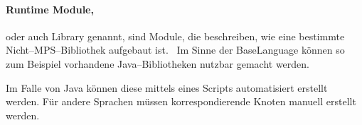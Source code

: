 \paragraph{Runtime Module,} oder auch Library genannt, sind Module, die beschreiben, wie eine bestimmte Nicht--\acs{MPS}--Bibliothek aufgebaut ist.~\autocite{jetbrains-sro-no-dateAA}
Im Sinne der BaseLanguage können so zum Beispiel vorhandene Java--Bibliotheken nutzbar gemacht werden.

Im Falle von Java können diese mittels eines Scripts automatisiert erstellt werden.
Für andere Sprachen müssen korrespondierende Knoten manuell erstellt werden.
